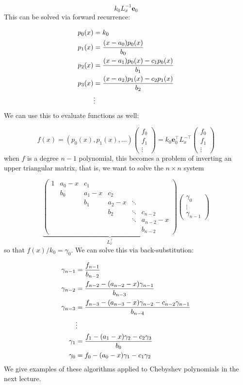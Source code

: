 \documentclass[12pt,a4paper]{article}
\def\vc#1{ {\mathbf #1} }
\begin{document}
\[
k_0 L_x^{-1} \vc e_0
\]
This  can be solved  via forward recurrence:


\begin{align*}
    p_0(x) &= k_0 \\
    p_1(x) &= {(x-a_0) p_0(x) \over b_0}\\
    p_2(x) &= {(x-a_1) p_0(x) - c_1 p_0(x) \over b_1}\\
    p_3(x) &= {(x-a_2) p_1(x) - c_2 p_1(x) \over b_2}\\
    &\vdots
\end{align*}
We can use this to evaluate functions as well:

\[
f(x) = (p_0(x),p_1(x),\ldots) \begin{pmatrix}f_0 \\ f_1\\ \vdots \end{pmatrix} =
k_0 \vc e_0^\top L_x^{-\top}  \begin{pmatrix}f_0 \\ f_1\\ \vdots \end{pmatrix}
\]
when $f$ is a degree $n-1$ polynomial, this becomes a problem of inverting an upper triangular matrix, that is, we want to solve the $n \times n$ system

\[
\underbrace{\begin{pmatrix}
1 & a_0-x & c_1 \\
& b_0 & a_1-x & c_2  \\
& & b_1 & a_2-x & \ddots  \\
& &     & b_2 & \ddots & c_{n-2} \\
&&&&\ddots & a_{n-2}-x \\
&&&&& b_{n-2}
\end{pmatrix}}_{L_x^\top} \begin{pmatrix} \gamma_0 \\\vdots\\ \gamma_{n-1} \end{pmatrix}
\]
so that $f(x)/k_0 = \gamma_0$. We can solve this  via back-substitution:


\begin{align*}
\gamma_{n-1} &= {f_{n-1} \over b_{n-2}} \\
\gamma_{n-2} &= {f_{n-2} - (a_{n-2}-x) \gamma_{n-1} \over b_{n-3}} \\
\gamma_{n-3} &= {f_{n-3} - (a_{n-3}-x) \gamma_{n-2} - c_{n-2} \gamma_{n-1} \over b_{n-4}} \\
& \vdots \\
\gamma_1 &= {f_1 - (a_1-x) \gamma_2 - c_2 \gamma_3 \over b_0} \\
\gamma_0 &= f_0 - (a_0-x) \gamma_1 - c_1 \gamma_2
\end{align*}
We give examples of these algorithms applied to Chebyshev polynomials in the next lecture.
\end{document}
